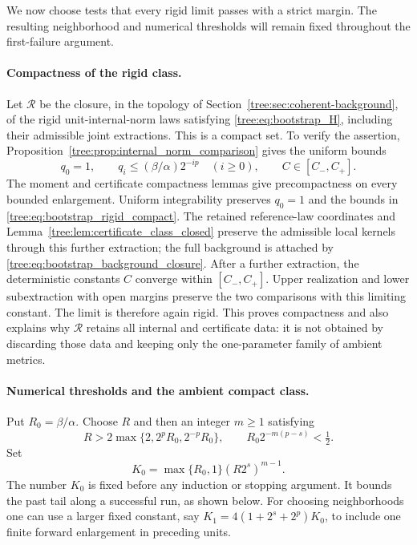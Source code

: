 We now choose tests that every rigid limit passes with a strict
margin.  The resulting neighborhood and numerical thresholds will
remain fixed throughout the first-failure argument.

\paragraph{Compactness of the rigid class.}
Let $\mathcal R$ be the closure, in the topology of
Section~\ref{tree:sec:coherent-background}, of the rigid
unit-internal-norm laws satisfying \eqref{tree:eq:bootstrap_H},
including their admissible joint extractions.  This is a compact
set.  To verify the assertion, Proposition~\ref{tree:prop:internal_norm_comparison}
gives the uniform bounds
\begin{equation}
 q_0=1,\qquad q_i\leq(\beta/\alpha)2^{-ip}
 \quad(i\geq0),\qquad C\in[C_-,C_+].
 \label{tree:eq:bootstrap_rigid_compact}
\end{equation}
The moment and certificate compactness lemmas give precompactness
on every bounded enlargement.  Uniform integrability preserves
$q_0=1$ and the bounds in \eqref{tree:eq:bootstrap_rigid_compact}.
The retained reference-law coordinates and
Lemma~\ref{tree:lem:certificate_class_closed} preserve the admissible
local kernels through this further extraction; the full
background is attached by
\eqref{tree:eq:bootstrap_background_closure}.
After a further extraction, the deterministic constants $C$
converge within $[C_-,C_+]$.  Upper realization and lower
subextraction with open margins preserve the two comparisons
with this limiting constant.  The limit is therefore again
rigid.  This proves compactness and also explains why
$\mathcal R$ retains all internal and certificate data: it is
not obtained by discarding those data and keeping only the
one-parameter family of ambient metrics.

\paragraph{Numerical thresholds and the ambient compact class.}
Put $R_0=\beta/\alpha$.  Choose $R$ and then an integer
$m\geq1$ satisfying
\begin{equation}
 R>2\max\{2,2^pR_0,2^{-p}R_0\},\qquad
 R_0 2^{-m(p-s)}<\tfrac12.
 \label{tree:eq:bootstrap_constants}
\end{equation}
Set
\[
 K_0=\max\{R_0,1\}(R2^s)^{m-1}.
\]
The number $K_0$ is fixed before any induction or stopping
argument.  It bounds the past tail along a successful run, as
shown below.  For choosing neighborhoods one can use a larger
fixed constant, say $K_1=4(1+2^s+2^p)K_0$, to include one
finite forward enlargement in preceding units.

